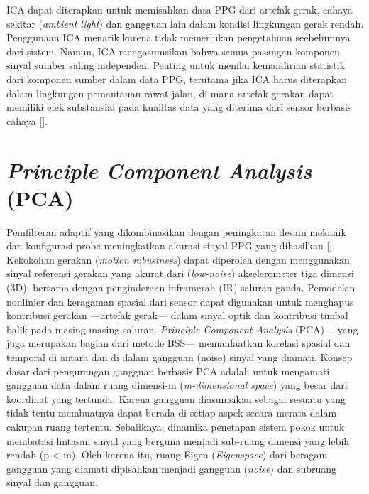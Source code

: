 ICA dapat diterapkan untuk memisahkan data PPG dari artefak gerak, cahaya sekitar (\textit{ambient light}) dan gangguan lain dalam kondisi lingkungan gerak rendah. Penggunaan ICA menarik karena tidak memerlukan pengetahuan seebelumnya dari sistem. Namun, ICA mengasumsikan bahwa semua pasangan komponen sinyal sumber saling independen. Penting untuk menilai kemandirian statistik dari komponen sumber dalam data PPG, terutama jika ICA harus diterapkan dalam lingkungan pemantauan rawat jalan, di mana artefak gerakan dapat memiliki efek substansial pada kualitas data yang diterima dari sensor berbasis cahaya [\citet{Tamura2014}].

\section{\textit{Principle Component Analysis} (PCA)}
Pemfilteran adaptif yang dikombinasikan dengan peningkatan desain mekanik dan konfigurasi probe meningkatkan akurasi sinyal PPG yang dihasilkan [\citet{Rhee2001}]. Kekokohan gerakan (\textit{motion robustness}) dapat diperoleh dengan menggunakan sinyal referensi gerakan yang akurat dari (\textit{low-noise}) akselerometer tiga dimensi (3D), bersama dengan penginderaan inframerah (IR) saluran ganda. Pemodelan nonlinier dan keragaman spasial dari sensor dapat digunakan untuk menghapus kontribusi gerakan ---artefak gerak--- dalam sinyal optik dan kontribusi timbal balik pada masing-masing saluran. \textit{Principle Component Analysis} (PCA) ---yang juga merupakan bagian dari metode BSS--- memanfaatkan korelasi spasial dan temporal di antara dan di dalam gangguan (noise) sinyal yang diamati. Konsep dasar dari pengurangan gangguan berbasis PCA adalah untuk mengamati gangguan data dalam ruang dimensi-m (\textit{m-dimensional space}) yang besar dari koordinat yang tertunda. Karena gangguan diasumsikan sebagai sesuatu yang tidak tentu membuatnya dapat berada di setiap aspek secara merata dalam cakupan ruang tertentu. Sebaliknya, dinamika penetapan sistem pokok untuk membatasi lintasan sinyal yang berguna menjadi sub-ruang dimensi yang lebih rendah (p < m). Oleh karena itu, ruang Eigen (\textit{Eigenspace}) dari beragam gangguan yang diamati dipisahkan menjadi gangguan (\textit{noise}) dan subruang sinyal dan gangguan.

